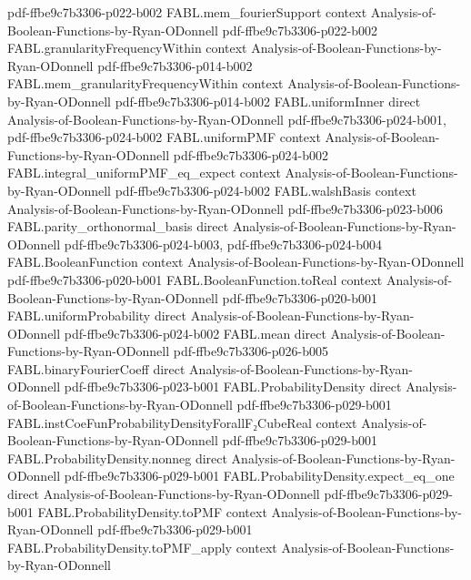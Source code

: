\begin{theorem}
  {pdf-ffbe9c7b3306-p022-b002}
\proofstep
  {FABL.mem_fourierSupport}
  {context}
  {Analysis-of-Boolean-Functions-by-Ryan-ODonnell}
  {pdf-ffbe9c7b3306-p022-b002}
\proofstep
  {FABL.granularityFrequencyWithin}
  {context}
  {Analysis-of-Boolean-Functions-by-Ryan-ODonnell}
  {pdf-ffbe9c7b3306-p014-b002}
\proofstep
  {FABL.mem_granularityFrequencyWithin}
  {context}
  {Analysis-of-Boolean-Functions-by-Ryan-ODonnell}
  {pdf-ffbe9c7b3306-p014-b002}
\proofstep
  {FABL.uniformInner}
  {direct}
  {Analysis-of-Boolean-Functions-by-Ryan-ODonnell}
  {pdf-ffbe9c7b3306-p024-b001,
    pdf-ffbe9c7b3306-p024-b002}
\proofstep
  {FABL.uniformPMF}
  {context}
  {Analysis-of-Boolean-Functions-by-Ryan-ODonnell}
  {pdf-ffbe9c7b3306-p024-b002}
\proofstep
  {FABL.integral_uniformPMF_eq_expect}
  {context}
  {Analysis-of-Boolean-Functions-by-Ryan-ODonnell}
  {pdf-ffbe9c7b3306-p024-b002}
\proofstep
  {FABL.walshBasis}
  {context}
  {Analysis-of-Boolean-Functions-by-Ryan-ODonnell}
  {pdf-ffbe9c7b3306-p023-b006}
\proofstep
  {FABL.parity_orthonormal_basis}
  {direct}
  {Analysis-of-Boolean-Functions-by-Ryan-ODonnell}
  {pdf-ffbe9c7b3306-p024-b003,
    pdf-ffbe9c7b3306-p024-b004}
\proofstep
  {FABL.BooleanFunction}
  {context}
  {Analysis-of-Boolean-Functions-by-Ryan-ODonnell}
  {pdf-ffbe9c7b3306-p020-b001}
\proofstep
  {FABL.BooleanFunction.toReal}
  {context}
  {Analysis-of-Boolean-Functions-by-Ryan-ODonnell}
  {pdf-ffbe9c7b3306-p020-b001}
\proofstep
  {FABL.uniformProbability}
  {direct}
  {Analysis-of-Boolean-Functions-by-Ryan-ODonnell}
  {pdf-ffbe9c7b3306-p024-b002}
\proofstep
  {FABL.mean}
  {direct}
  {Analysis-of-Boolean-Functions-by-Ryan-ODonnell}
  {pdf-ffbe9c7b3306-p026-b005}
\proofstep
  {FABL.binaryFourierCoeff}
  {direct}
  {Analysis-of-Boolean-Functions-by-Ryan-ODonnell}
  {pdf-ffbe9c7b3306-p023-b001}
\proofstep
  {FABL.ProbabilityDensity}
  {direct}
  {Analysis-of-Boolean-Functions-by-Ryan-ODonnell}
  {pdf-ffbe9c7b3306-p029-b001}
\proofstep
  {FABL.instCoeFunProbabilityDensityForallF₂CubeReal}
  {context}
  {Analysis-of-Boolean-Functions-by-Ryan-ODonnell}
  {pdf-ffbe9c7b3306-p029-b001}
\proofstep
  {FABL.ProbabilityDensity.nonneg}
  {direct}
  {Analysis-of-Boolean-Functions-by-Ryan-ODonnell}
  {pdf-ffbe9c7b3306-p029-b001}
\proofstep
  {FABL.ProbabilityDensity.expect_eq_one}
  {direct}
  {Analysis-of-Boolean-Functions-by-Ryan-ODonnell}
  {pdf-ffbe9c7b3306-p029-b001}
\proofstep
  {FABL.ProbabilityDensity.toPMF}
  {context}
  {Analysis-of-Boolean-Functions-by-Ryan-ODonnell}
  {pdf-ffbe9c7b3306-p029-b001}
\proofstep
  {FABL.ProbabilityDensity.toPMF_apply}
  {context}
  {Analysis-of-Boolean-Functions-by-Ryan-ODonnell}

\end{theorem}
